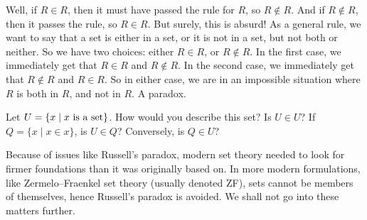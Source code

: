 Well, if $R \in R$, then it must have passed the rule for $R$, so $R \notin R$. And if $R \notin R$, then it passes the rule, so $R \in R$. But surely, this is absurd! As a general rule, we want to say that a set is either in a set, or it is not in a set, but not both or neither. So we have two choices: either $R \in R$, or $R \notin R$. In the first case, we immediately get that $R \in R$ and $R \notin R$. In the second case, we immediately get that $R \notin R$ and $R \in R$. So in either case, we are in an impossible situation where $R$ is both in $R$, and not in $R$. A paradox. 


\begin{exc}
Let $U=\{x \mid x \text{ is a set}\}$. How would you describe this set? Is $U \in U$? If $Q=\{x \mid x \in x\}$, is $U \in Q$? Conversely, is $Q \in U$?
\end{exc}

Because of issues like Russell's paradox, modern set theory needed to look for firmer foundations than it was originally based on. In more modern formulations, like Zermelo–Fraenkel  set theory (usually denoted ZF), sets cannot be members of themselves, hence Russell's paradox is avoided. We shall not go into these matters further. 
